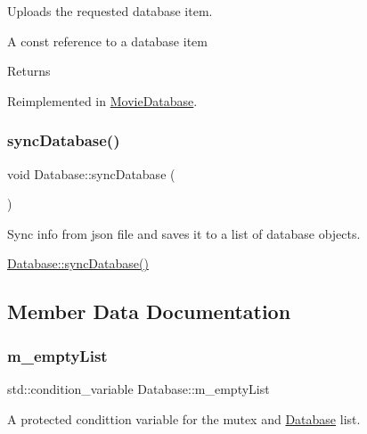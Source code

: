 Uploads the requested database item. 

A const reference to a database item

\begin{DoxyReturn}{Returns}

\end{DoxyReturn}


Reimplemented in \hyperlink{classMovieDatabase_a203b9b5c1b325997ce519859a436b6ce}{Movie\+Database}.

\mbox{\label{classDatabase_ac77c61314a54bf3bc1bcbcf7986998e8}} 
\subsubsection{\texorpdfstring{sync\+Database()}{syncDatabase()}}
{\footnotesize\ttfamily void Database\+::sync\+Database (\begin{DoxyParamCaption}{ }\end{DoxyParamCaption})\hspace{0.3cm}{\ttfamily [inline]}}



Sync info from json file and saves it to a list of database objects. 

\hyperlink{classDatabase_ac77c61314a54bf3bc1bcbcf7986998e8}{Database\+::sync\+Database()} 

\subsection{Member Data Documentation}
\mbox{\label{classDatabase_a2ad8bf38964b3e18a0e168437acbdb27}} 
\subsubsection{\texorpdfstring{m\+\_\+empty\+List}{m\_emptyList}}
{\footnotesize\ttfamily std\+::condition\+\_\+variable Database\+::m\+\_\+empty\+List\hspace{0.3cm}{\ttfamily [protected]}}



A protected condittion variable for the mutex and \hyperlink{classDatabase}{Database} list. 

